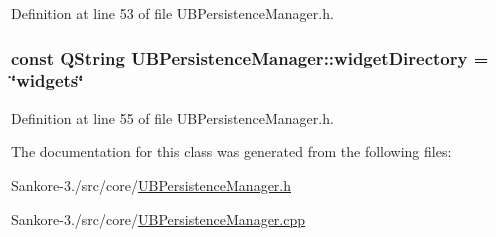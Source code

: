 Definition at line 53 of file U\-B\-Persistence\-Manager.\-h.

\hypertarget{class_u_b_persistence_manager_a7c481362bd285b72aa501b9a6f70b314}{
\subsubsection[{widget\-Directory}]{\setlength{\rightskip}{0pt plus 5cm}const Q\-String U\-B\-Persistence\-Manager\-::widget\-Directory = \char`\"{}widgets\char`\"{}\hspace{0.3cm}{\ttfamily [static]}}}\label{d0/dd5/class_u_b_persistence_manager_a7c481362bd285b72aa501b9a6f70b314}


Definition at line 55 of file U\-B\-Persistence\-Manager.\-h.



The documentation for this class was generated from the following files\-:\begin{DoxyCompactItemize}
\item 
Sankore-\/3./src/core/\hyperlink{_u_b_persistence_manager_8h}{U\-B\-Persistence\-Manager.\-h}\item 
Sankore-\/3./src/core/\hyperlink{_u_b_persistence_manager_8cpp}{U\-B\-Persistence\-Manager.\-cpp}\end{DoxyCompactItemize}
